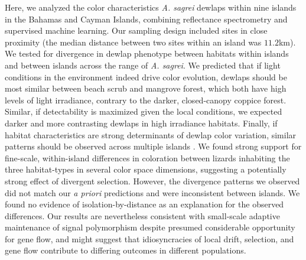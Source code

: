 Here, we analyzed the color characteristics \textit{A. sagrei} dewlaps within nine islands in the Bahamas and Cayman Islands, combining reflectance spectrometry and supervised machine learning. Our sampling design included sites in close proximity (the median distance between two sites within an island was $11.2$km). We tested for divergence in dewlap phenotype between habitats within islands and between islands across the range of \textit{A. sagrei}. We predicted that if light conditions in the environment indeed drive color evolution, dewlaps should be most similar between beach scrub and mangrove forest, which both have high levels of light irradiance, contrary to the darker, closed-canopy coppice forest. Similar, if detectability is maximized given the local conditions, we expected darker and more contrasting dewlaps in high irradiance habitats. Finally, if habitat characteristics are strong determinants of dewlap color variation, similar patterns should be observed across multiple islands \citep{Losos2011}. We found strong support for fine-scale, within-island differences in coloration between lizards inhabiting the three habitat-types in several color space dimensions, suggesting a potentially strong effect of divergent selection. However, the divergence patterns we observed did not match our \textit{a priori} predictions and were inconsistent between islands. We found no evidence of isolation-by-distance as an explanation for the observed differences. Our results are nevertheless consistent with small-scale adaptive maintenance of signal polymorphism despite presumed considerable opportunity for gene flow, and might suggest that idiosyncracies of local drift, selection, and gene flow contribute to differing outcomes in different populations.




